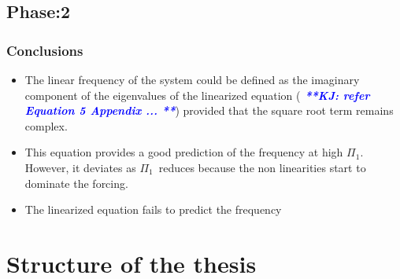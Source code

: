 \documentclass[authoryear,12pt]{article}
\newcommand{\massstiff}{\ensuremath{\Pi_1}}
\newcommand{\KJ}[1]{{\textcolor{blue}{{\bf{\it{ **KJ: #1 **}}}}}}
\begin{document}
\subsection{Phase:2}
 
 
 
\subsubsection{Conclusions}

\begin{itemize}

\item The linear frequency of the system could be defined as the imaginary component of the eigenvalues of the linearized equation (\KJ{refer Equation 5 Appendix ...}) provided that the square root term remains complex. 

\item This equation provides a good prediction of the frequency at high \massstiff. However, it deviates as \massstiff \ reduces because the non linearities start to dominate the forcing. 

\item The linearized equation fails to predict the frequency   

\end{itemize}



\section{Structure of the thesis}


\clearpage


\end{document}

